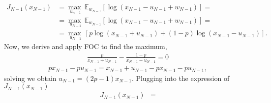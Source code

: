 \documentclass[11pt, english]{article}
\begin{document}
\begin{align}
	J_{N-1}(x_{N-1})&=\underset{u_{n-1}}{\max\ }\mathbb{E}_{w_{N-1}}\left[\log(x_{N-1}-u_{N-1}+w_{N-1})\right]=\\
	&=\underset{u_{N-1}}{\max\ }\mathbb{E}_{w_{N-1}}[\log(x_{N-1}-u_{N-1}+w_{N-1})]=\\
	&=\underset{u_{N-1}}{\max\ }\left[p\log(x_{N-1}+u_{N-1})+(1-p)\log(x_{N-1}-u_{N-1})\right].
\end{align}
Now, we derive and apply FOC to find the maximum,
\begin{align}
	\frac{p}{x_{N-1}+u_{N-1}}-\frac{1-p}{x_{N-1}-u_{N-1}}=0
\end{align}
\begin{align}
	px_{N-1}-pu_{N-1}=x_{N-1}+u_{N-1}-px_{N-1}-pu_{N-1},
\end{align}
solving we obtain $u_{N-1}=(2p-1)x_{N-1}$. Plugging into the expression of $J_{N-1}(x_{N-1})$
\begin{align}
	J_{N-1}(x_{N-1})&=
\end{align}
\end{document}
